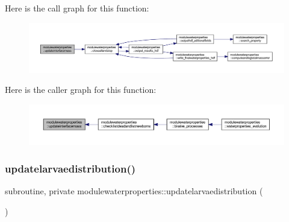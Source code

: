 Here is the call graph for this function\+:\nopagebreak
\begin{figure}[H]
\begin{center}
\leavevmode
\includegraphics[width=350pt]{namespacemodulewaterproperties_a20082ef8bcaf7ce51aa737521cbeea5b_cgraph}
\end{center}
\end{figure}
Here is the caller graph for this function\+:\nopagebreak
\begin{figure}[H]
\begin{center}
\leavevmode
\includegraphics[width=350pt]{namespacemodulewaterproperties_a20082ef8bcaf7ce51aa737521cbeea5b_icgraph}
\end{center}
\end{figure}
\mbox{\label{namespacemodulewaterproperties_a9362aa51fad7e9cae9cd548057855662}} 
\subsubsection{\texorpdfstring{updatelarvaedistribution()}{updatelarvaedistribution()}}
{\footnotesize\ttfamily subroutine, private modulewaterproperties\+::updatelarvaedistribution (\begin{DoxyParamCaption}{ }\end{DoxyParamCaption})\hspace{0.3cm}{\ttfamily [private]}}

